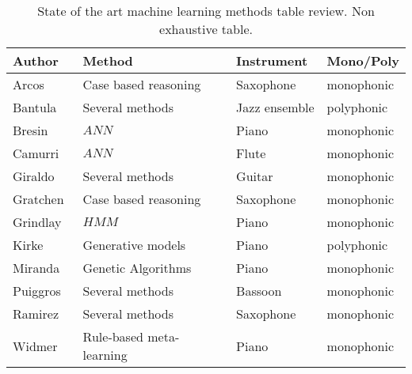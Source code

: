 \begin{table}[ht!]
\centering

  \begin{tabular}{  l l l l }
    \hline
	Author & Method & Instrument & Mono/Poly \\ \hline
    Arcos~\cite{Arcos1998} & Case based reasoning & Saxophone & monophonic\\
    Bantula~\cite{bantula2016} & Several methods & Jazz ensemble & polyphonic \\
    Bresin~\cite{Bresin2000}~\cite{Bresin1998}& $ANN$ & Piano & monophonic\\
    Camurri~\cite{Camurri2000} & $ANN$ & Flute & monophonic\\
    Giraldo~\cite{Giraldo2016} & Several methods & Guitar & monophonic \\
    Gratchen~\cite{Grachten2006} & Case based reasoning & Saxophone & monophonic \\
    Grindlay~\cite{Grindlay2006} & $HMM$ & Piano & monophonic\\
    Kirke~\cite{KirkeAlexisMiranda2013} & Generative models & Piano & polyphonic \\
    Miranda~\cite{Miranda2010}& Genetic Algorithms & Piano & monophonic\\
    Puiggros~\cite{Puiggros2006} & Several methods & Bassoon & monophonic \\
    Ramirez~\cite{Ramirez2006} & Several methods & Saxophone & monophonic \\
    Widmer~\cite{Widmer2003}~\cite{Widmer2003a} & Rule-based meta-learning & Piano & monophonic\\
 
    
    \hline
  \end{tabular}

  \caption[State of the art machine learning methods table review.]{State of the art machine learning methods table review. Non exhaustive table.}
  \label{tab:sota_ml}

\end{table}
